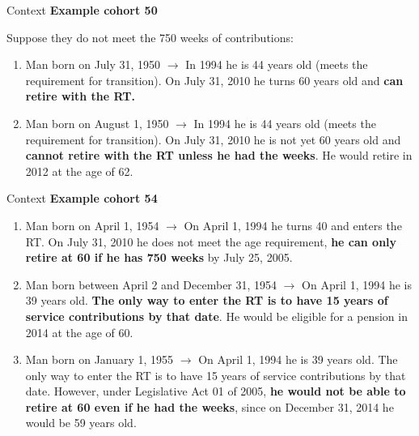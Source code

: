 \documentclass[11pt, aspectratio=169]{beamer}
\begin{document}
\begin{frame}{Context}
\textbf{Example cohort 50}

    Suppose they do not meet the 750 weeks of contributions:

    \begin{enumerate}
        \item Man born on July 31, 1950 $\longrightarrow$ In 1994 he is 44 years old (meets the requirement for transition). On July 31, 2010 he turns 60 years old and \textbf{can retire with the RT.}
        \item Man born on August 1, 1950 $\longrightarrow$ In 1994 he is 44 years old (meets the requirement for transition). On July 31, 2010 he is not yet 60 years old and \textbf{cannot retire with the RT unless he had the weeks}. He would retire in 2012 at the age of 62.
    \end{enumerate}

\end{frame}

\begin{frame}{Context}
    \textbf{Example cohort 54}

    \begin{enumerate}
        \item Man born on April 1, 1954 $\longrightarrow$ On April 1, 1994 he turns 40 and enters the RT. On July 31, 2010 he does not meet the age requirement, \textbf{he can only retire at 60 if he has 750 weeks} by July 25, 2005.
        \item Man born between April 2 and December 31, 1954 $\longrightarrow$ On April 1, 1994 he is 39 years old. \textbf{The only way to enter the RT is to have 15 years of service contributions by that date}. He would be eligible for a pension in 2014 at the age of 60.
        \item Man born on January 1, 1955 $\longrightarrow$ On April 1, 1994 he is 39 years old. The only way to enter the RT is to have 15 years of service contributions by that date. However, under Legislative Act 01 of 2005, \textbf{he would not be able to retire at 60 even if he had the weeks}, since on December 31, 2014 he would be 59 years old.
    \end{enumerate}
\end{frame}
\end{document}
